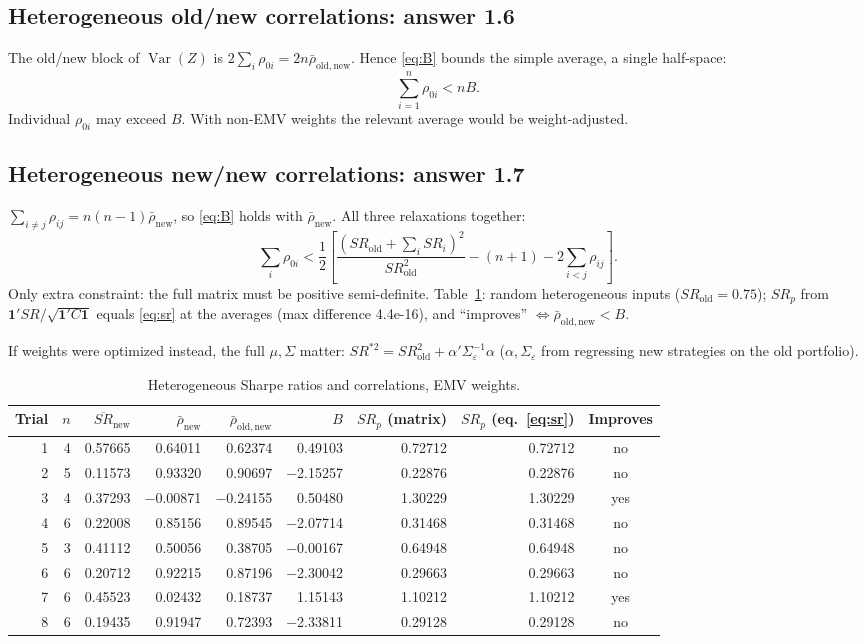 \documentclass[11pt,letterpaper]{article}
\newcommand{\SRo}{SR_{\mathrm{old}}}
\newcommand{\rHetMaxDiff}{4.4e-16}
\begin{document}
\subsection*{Heterogeneous old/new correlations: answer 1.6}
The old/new block of $\operatorname{Var}(Z)$ is $2\sum_i\rho_{0i}=2n\bar\rho_{\mathrm{old,new}}$. Hence \eqref{eq:B} bounds the simple average, a single half-space:
\[
\textstyle\sum_{i=1}^n\rho_{0i}<nB .
\]
Individual $\rho_{0i}$ may exceed $B$. With non-EMV weights the relevant average would be weight-adjusted.

\subsection*{Heterogeneous new/new correlations: answer 1.7}
$\sum_{i\ne j}\rho_{ij}=n(n-1)\bar\rho_{\mathrm{new}}$, so \eqref{eq:B} holds with $\bar\rho_{\mathrm{new}}$. All three relaxations together:
\[
\sum_i\rho_{0i}<\frac12\left[\frac{(\SRo+\sum_iSR_i)^2}{\SRo^2}-(n+1)-2\sum_{i<j}\rho_{ij}\right].
\]
Only extra constraint: the full matrix must be positive semi-definite. Table~\ref{tab:het}: random heterogeneous inputs ($\SRo=0.75$); $SR_p$ from $\mathbf1'SR/\sqrt{\mathbf1'C\mathbf1}$ equals \eqref{eq:sr} at the averages (max difference \rHetMaxDiff{}), and ``improves'' $\iff\bar\rho_{\mathrm{old,new}}<B$.

If weights were optimized instead, the full $\mu,\Sigma$ matter: $SR^{*2}=\SRo^2+\alpha'\Sigma_\varepsilon^{-1}\alpha$ ($\alpha,\Sigma_\varepsilon$ from regressing new strategies on the old portfolio).

\begin{table}[H]\centering\small\setlength{\tabcolsep}{4.5pt}\caption{Heterogeneous Sharpe ratios and correlations, EMV weights.}\label{tab:het}
\begin{tabular}{rrrrrrrrc}\toprule
Trial & $n$ & $\overline{SR}_{\mathrm{new}}$ & $\bar\rho_{\mathrm{new}}$ & $\bar\rho_{\mathrm{old,new}}$ & $B$ & $SR_p$ (matrix) & $SR_p$ (eq.~\ref{eq:sr}) & Improves\\\midrule
1 & 4 & 0.57665 & 0.64011 & 0.62374 & 0.49103 & 0.72712 & 0.72712 & no \\
2 & 5 & 0.11573 & 0.93320 & 0.90697 & $-$2.15257 & 0.22876 & 0.22876 & no \\
3 & 4 & 0.37293 & $-$0.00871 & $-$0.24155 & 0.50480 & 1.30229 & 1.30229 & yes \\
4 & 6 & 0.22008 & 0.85156 & 0.89545 & $-$2.07714 & 0.31468 & 0.31468 & no \\
5 & 3 & 0.41112 & 0.50056 & 0.38705 & $-$0.00167 & 0.64948 & 0.64948 & no \\
6 & 6 & 0.20712 & 0.92215 & 0.87196 & $-$2.30042 & 0.29663 & 0.29663 & no \\
7 & 6 & 0.45523 & 0.02432 & 0.18737 & 1.15143 & 1.10212 & 1.10212 & yes \\
8 & 6 & 0.19435 & 0.91947 & 0.72393 & $-$2.33811 & 0.29128 & 0.29128 & no \\
\bottomrule\end{tabular}\end{table}
\end{document}
